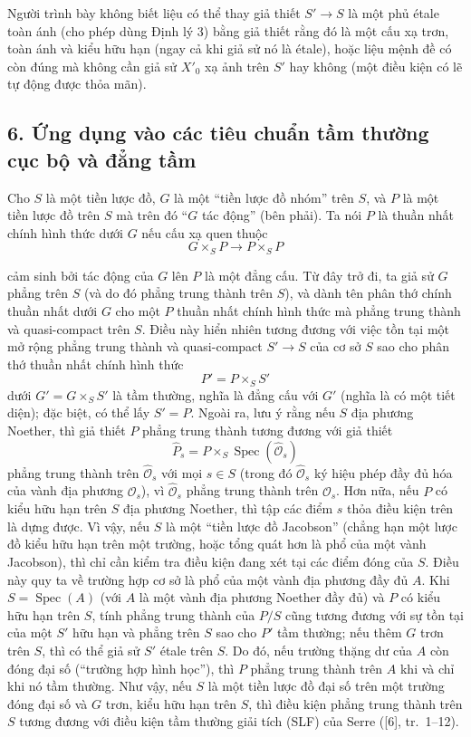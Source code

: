  Người trình bày không biết liệu có thể thay giả thiết
$S'\longrightarrow S$ là một phủ étale toàn ánh (cho phép dùng Định lý 3) bằng
giả thiết rằng đó là một cấu xạ trơn, toàn ánh và kiểu hữu hạn (ngay cả khi giả
sử nó là étale), hoặc liệu mệnh đề có còn đúng mà không cần giả sử $X'_0$ xạ
ảnh trên $S'$ hay không (một điều kiện có lẽ tự động được thỏa mãn).

\subsection*{6. Ứng dụng vào các tiêu chuẩn tầm thường cục bộ và đẳng tầm}

Cho $S$ là một tiền lược đồ, $G$ là một ``tiền lược đồ nhóm'' trên $S$, và $P$
là một tiền lược đồ trên $S$ mà trên đó ``$G$ tác động'' (bên phải). Ta nói
$P$ là thuần nhất chính hình thức dưới $G$ nếu cấu xạ quen thuộc
\[
  G\times_SP\longrightarrow P\times_SP
\]

cảm sinh bởi tác động của $G$ lên $P$ là một đẳng cấu. Từ đây trở đi, ta giả
sử $G$ phẳng trên $S$ (và do đó phẳng trung thành trên $S$), và dành tên
phân thớ chính thuần nhất dưới $G$ cho một $P$ thuần nhất chính hình thức
mà phẳng trung thành và quasi-compact trên $S$. Điều này hiển nhiên tương đương
với việc tồn tại một mở rộng phẳng trung thành và quasi-compact
$S'\longrightarrow S$ của cơ sở $S$ sao cho phân thớ thuần nhất chính hình thức
\[
  P'=P\times_SS'
\]
dưới $G'=G\times_SS'$ là tầm thường, nghĩa là đẳng cấu với $G'$ (nghĩa là có
một tiết diện); đặc biệt, có thể lấy $S'=P$. Ngoài ra, lưu ý rằng nếu $S$ địa
phương Noether, thì giả thiết $P$ phẳng trung thành tương đương với
giả thiết
\[
  \widehat P_s=P\times_S\operatorname{Spec}(\widehat{\mathcal O}_s)
\]
phẳng trung thành trên $\widehat{\mathcal O}_s$ với mọi $s\in S$ (trong đó
$\widehat{\mathcal O}_s$ ký hiệu phép đầy đủ hóa của vành địa phương
$\mathcal O_s$), vì $\widehat{\mathcal O}_s$ phẳng trung thành trên
$\mathcal O_s$. Hơn nữa, nếu $P$ có kiểu hữu hạn trên $S$ địa phương Noether,
thì tập các điểm $s$ thỏa điều kiện trên là dựng được. Vì vậy, nếu $S$ là một
``tiền lược đồ Jacobson'' (chẳng hạn một lược đồ kiểu hữu hạn trên một trường,
hoặc tổng quát hơn là phổ của một vành Jacobson), thì chỉ cần kiểm tra điều kiện
đang xét tại các điểm đóng của $S$. Điều này quy ta về trường hợp cơ sở là phổ
của một vành địa phương đầy đủ $A$. Khi $S=\operatorname{Spec}(A)$ (với $A$ là
một vành địa phương Noether đầy đủ) và $P$ có kiểu hữu hạn trên $S$, tính phẳng
trung thành của $P/S$ cũng tương đương với sự tồn tại của một $S'$ hữu hạn và
phẳng trên $S$ sao cho $P'$ tầm thường; nếu thêm $G$ trơn trên $S$, thì có thể
giả sử $S'$ étale trên $S$. Do đó, nếu trường thặng dư của $A$ còn đóng đại số
(``trường hợp hình học''), thì $P$ phẳng trung thành trên $A$ khi và chỉ khi nó
tầm thường. Như vậy, nếu $S$ là một tiền lược đồ đại số trên một trường đóng
đại số và $G$ trơn, kiểu hữu hạn trên $S$, thì điều kiện phẳng trung thành trên
$S$ tương đương với điều kiện tầm thường giải tích (SLF) của Serre ([6],
tr.~1--12).

